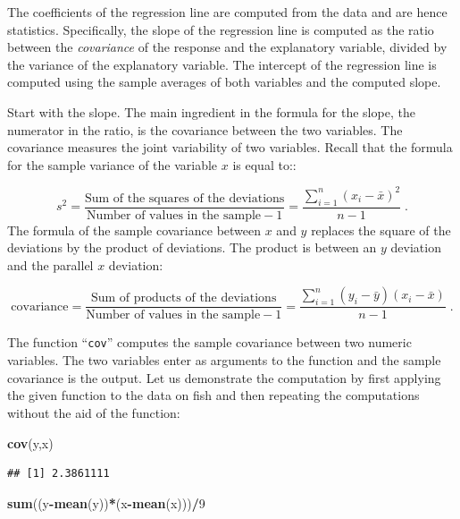 \documentclass[]{krantz}
\makeatletter
\newenvironment{Shaded}{\begin{snugshade}}{\end{snugshade}}
\newcommand{\DecValTok}[1]{\textcolor[rgb]{0.00,0.00,0.81}{#1}}
\newcommand{\KeywordTok}[1]{\textcolor[rgb]{0.13,0.29,0.53}{\textbf{#1}}}
\newcommand{\NormalTok}[1]{#1}
\newcommand{\OperatorTok}[1]{\textcolor[rgb]{0.81,0.36,0.00}{\textbf{#1}}}
\newenvironment{kframe}{%
\medskip{}
\setlength{\fboxsep}{.8em}
 \def\at@end@of@kframe{}%
 \ifinner\ifhmode%
  \def\at@end@of@kframe{\end{minipage}}%
  \begin{minipage}{\columnwidth}%
 \fi\fi%
 \def\FrameCommand##1{\hskip\@totalleftmargin \hskip-\fboxsep
 \colorbox{shadecolor}{##1}\hskip-\fboxsep
     \hskip-\linewidth \hskip-\@totalleftmargin \hskip\columnwidth}%
 \MakeFramed {\advance\hsize-\width
   \@totalleftmargin\z@ \linewidth\hsize
   \@setminipage}}%
 {\par\unskip\endMakeFramed%
 \at@end@of@kframe}
\renewenvironment{Shaded}{\begin{kframe}}{\end{kframe}}
\theoremstyle{definition}
\theoremstyle{definition}
\theoremstyle{definition}
\theoremstyle{remark}
\makeatother
\begin{document}
The coefficients of the regression line are computed from the data and
are hence statistics. Specifically, the slope of the regression line is
computed as the ratio between the \emph{covariance} of the response and the
explanatory variable, divided by the variance of the explanatory
variable. The intercept of the regression line is computed using the
sample averages of both variables and the computed slope.

Start with the slope. The main ingredient in the formula for the slope,
the numerator in the ratio, is the covariance between the two variables.
The covariance measures the joint variability of two variables. Recall
that the formula for the sample variance of the variable \(x\) is equal
to::

\[s^2 = \frac{\mbox{Sum of the squares of the deviations}}{\mbox{Number of values in the sample}-1} = \frac{\sum_{i=1}^n (x_i - \bar x)^2}{n-1}\;.\]
The formula of the sample covariance between \(x\) and \(y\) replaces the
square of the deviations by the product of deviations. The product is
between an \(y\) deviation and the parallel \(x\) deviation:

\[\mbox{covariance} = \frac{\mbox{Sum of products of the deviations}}{\mbox{Number of values in the sample}-1} = \frac{\sum_{i=1}^n (y_i-\bar y)(x_i - \bar x)}{n-1}\;.\]

The function ``\texttt{cov}'' computes the sample covariance between two numeric
variables. The two variables enter as arguments to the function and the
sample covariance is the output. Let us demonstrate the computation by
first applying the given function to the data on fish and then repeating
the computations without the aid of the function:

\begin{Shaded}
\begin{Highlighting}[]
\KeywordTok{cov}\NormalTok{(y,x)}
\end{Highlighting}
\end{Shaded}

\begin{verbatim}
## [1] 2.3861111
\end{verbatim}

\begin{Shaded}
\begin{Highlighting}[]
\KeywordTok{sum}\NormalTok{((y}\OperatorTok{-}\KeywordTok{mean}\NormalTok{(y))}\OperatorTok{*}\NormalTok{(x}\OperatorTok{-}\KeywordTok{mean}\NormalTok{(x)))}\OperatorTok{/}\DecValTok{9}
\end{Highlighting}
\end{Shaded}
\end{document}
